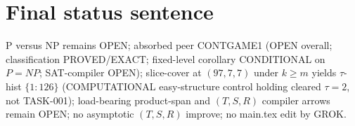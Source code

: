 \documentclass[11pt]{article}
\begin{document}
\section*{Final status sentence}
P versus NP remains OPEN; absorbed peer CONTGAME1 (OPEN overall; classification PROVED/EXACT;
fixed-level corollary CONDITIONAL on $P{=}NP$; SAT-compiler OPEN); slice-cover at $(97,7,7)$ under
$k{\ge}m$ yields $\tau$-hist $\{1{:}126\}$ (COMPUTATIONAL easy-structure control holding
cleared $\tau{=}2$, not TASK-001); load-bearing product-span and $(T,S,R)$ compiler arrows remain OPEN;
no asymptotic $(T,S,R)$ improve; no main.tex edit by GROK.
\end{document}
